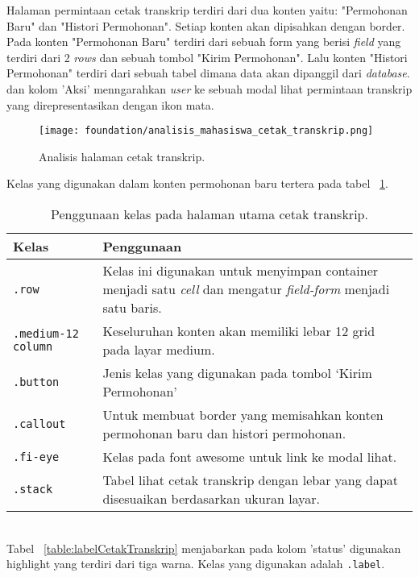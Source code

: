 Halaman permintaan cetak transkrip terdiri dari dua konten yaitu: "Permohonan Baru" dan "Histori Permohonan". Setiap konten akan dipisahkan dengan border. Pada konten "Permohonan Baru" terdiri dari sebuah form yang berisi \textit{field} yang terdiri dari 2 \textit{rows} dan sebuah tombol "Kirim Permohonan". Lalu konten "Histori Permohonan" terdiri dari sebuah tabel dimana data akan dipanggil dari \textit{database}.  dan kolom 'Aksi' menngarahkan \textit{user} ke sebuah modal lihat permintaan transkrip yang direpresentasikan dengan ikon mata.

\begin{figure} [H]
	\centering  
	\texttt{[image: foundation/analisis\_mahasiswa\_cetak\_transkrip.png]}
	\caption{Analisis halaman cetak transkrip.} 
	\label{fig:analisisCetakTranskrip}
\end{figure} 
\noindent Kelas yang digunakan dalam konten permohonan baru tertera pada tabel ~\ref{table:analisisCetakTranskrip}.\\

\begin{table}[H]
	\centering
	\caption{Penggunaan kelas pada halaman utama cetak transkrip.}
	\begin{tabularx}{\textwidth}{lX}
		\toprule
		Kelas     & Penggunaan \\
		\midrule
		\texttt{.row} & Kelas ini digunakan untuk menyimpan container menjadi satu \textit{cell} dan mengatur \textit{field-form} menjadi satu baris. \\
		\texttt{.medium-12 column}& Keseluruhan konten akan memiliki lebar 12 grid pada layar medium.\\
		\texttt{.button} & Jenis kelas yang digunakan pada tombol `Kirim Permohonan'\\
		\texttt{.callout} & Untuk membuat border yang memisahkan konten permohonan baru dan histori permohonan.\\
		\texttt{.fi-eye}& Kelas pada font awesome untuk link ke modal lihat.\\		
		\texttt{.stack} & Tabel lihat cetak transkrip dengan lebar yang dapat disesuaikan berdasarkan ukuran layar.\\
		\bottomrule
	\end{tabularx}%
	\label{table:analisisCetakTranskrip}
\end{table} \\ 

\noindent Tabel ~\ref{table:labelCetakTranskrip} menjabarkan pada kolom 'status' digunakan highlight yang terdiri dari tiga warna. Kelas yang digunakan adalah \texttt{.label}.\\

